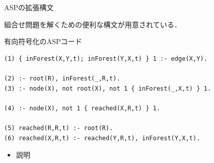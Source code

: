 \documentclass[dvipdfmx,11pt]{beamer}
\newcommand{\code}[1]{\lstinline[basicstyle=\ttfamily]{#1}}
\begin{document}
\begin{frame}{ASPの拡張構文}
\begin{alertblock}{}\centering
  組合せ問題を解くための便利な構文が用意されている．
\end{alertblock}
\end{frame}
\begin{frame}[fragile]{有向符号化のASPコード}
\begin{exampleblock}{}
\begin{lstlisting}
(1) { inForest(X,Y,t); inForest(Y,X,t) } 1 :- edge(X,Y).

(2) :- root(R), inForest(_,R,t).
(3) :- node(X), not root(X), not 1 { inForest(_,X,t) } 1.

(4) :- node(X), not 1 { reached(X,R,t) } 1.

(5) reached(R,R,t) :- root(R).
(6) reached(X,R,t) :- reached(Y,R,t), inForest(Y,X,t).
\end{lstlisting}
\end{exampleblock}
\begin{itemize}
 \item 説明
\end{itemize}
\end{frame}
\end{document}
